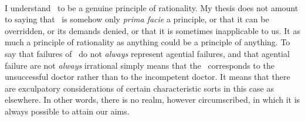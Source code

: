 \documentclass[11pt,letterpaper,oneside]{amsart}
\begin{document}










\


I understand \enk\ to be a genuine principle of rationality. My thesis does not amount to saying that \enk\ is somehow only \emph{prima facie} a principle, or that it can be overridden, or its demands denied, or that it is sometimes inapplicable to us. It as much a principle of rationality as anything could be a principle of anything. To say that failures of \enk\ do not \emph{always} represent agential failures, and that agential failure are not \emph{always} irrational simply means that the \ak\ corresponds to the unsuccessful doctor rather than to the incompetent doctor. It means that there are exculpatory considerations of certain characteristic sorts in this case as elsewhere. In other words, there is no realm, however circumscribed, in which it is always possible to attain our aims.


\end{document}
